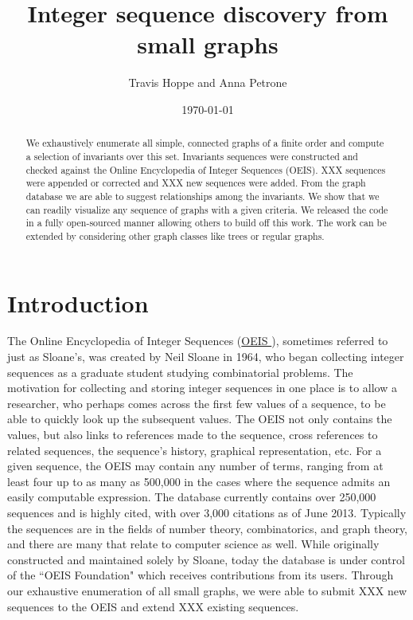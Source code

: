 \documentclass[12pt]{article}
\newcommand{\OEIS}[1]
{\href{https://oeis.org/#1}{OEIS \texttt{#1}}}
\begin{document}
\setlength{\parindent}{0cm}

\title{Integer sequence discovery from small graphs}
\author{Travis Hoppe and Anna Petrone}
\date{\today}
\maketitle

\begin{abstract}
We exhaustively enumerate all simple, connected graphs of a finite order and compute a selection of invariants over this set.
Invariants sequences were constructed and checked against the Online Encyclopedia of Integer Sequences (OEIS).
XXX sequences were appended or corrected and XXX new sequences were added.
From the graph database we are able to suggest relationships among the invariants.
We show that we can readily visualize any sequence of graphs with a given criteria.
We released the code in a fully open-sourced manner allowing others to build off this work.
The work can be extended by considering other graph classes like trees or regular graphs.
\end{abstract}

\section{Introduction}

The Online Encyclopedia of Integer Sequences (\OEIS{}), sometimes referred to just as Sloane's, was created by Neil Sloane in 1964, who began collecting integer sequences as a graduate student studying combinatorial problems. 
The motivation for collecting and storing integer sequences in one place is to allow a researcher, who perhaps comes across the first few values of a sequence, to be able to quickly look up the subsequent values. 
The OEIS not only contains the values, but also links to references made to the sequence, cross references to related sequences, the sequence's history, graphical representation, etc. 
For a given sequence, the OEIS may contain any number of terms, ranging from at least four up to as many as 500,000 in the cases where the sequence admits an easily computable expression.
The database currently contains over 250,000 sequences and is highly cited, with over 3,000 citations as of June 2013. 
Typically the sequences are in the fields of number theory, combinatorics, and graph theory, and there are many that relate to computer science as well. 
While originally constructed and maintained solely by Sloane, today the database is under control of the ``OEIS Foundation" which receives contributions from its users. 
Through our exhaustive enumeration of all small graphs, we were able to submit XXX new sequences to the OEIS and extend XXX existing sequences.
\end{document}
